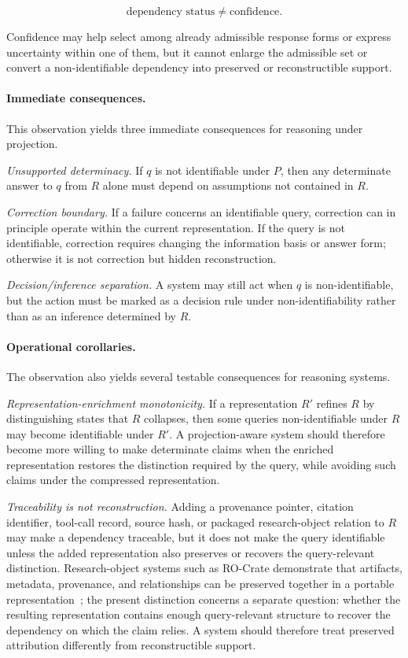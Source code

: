 \documentclass[11pt]{article}
\theoremstyle{definition}
\theoremstyle{remark}
\begin{document}
\[
\boxed{
\text{dependency status}
\neq
\text{confidence}.
}
\]

Confidence may help select among already admissible response forms or express uncertainty within one of them, but it cannot enlarge the admissible set or convert a non-identifiable dependency into preserved or reconstructible support.

\paragraph{Immediate consequences.}
This observation yields three immediate consequences for reasoning under projection.

\emph{Unsupported determinacy.}
If $q$ is not identifiable under $P$, then any determinate answer to $q$ from $R$ alone must depend on assumptions not contained in $R$.

\emph{Correction boundary.}
If a failure concerns an identifiable query, correction can in principle operate within the current representation. If the query is not identifiable, correction requires changing the information basis or answer form; otherwise it is not correction but hidden reconstruction.

\emph{Decision/inference separation.}
A system may still act when $q$ is non-identifiable, but the action must be marked as a decision rule under non-identifiability rather than as an inference determined by $R$.

\paragraph{Operational corollaries.}
The observation also yields several testable consequences for reasoning systems.

\emph{Representation-enrichment monotonicity.}
If a representation $R'$ refines $R$ by distinguishing states that $R$ collapses, then some queries non-identifiable under $R$ may become identifiable under $R'$. A projection-aware system should therefore become more willing to make determinate claims when the enriched representation restores the distinction required by the query, while avoiding such claims under the compressed representation.

\emph{Traceability is not reconstruction.}
Adding a provenance pointer, citation identifier, tool-call record, source hash, or packaged research-object relation to $R$ may make a dependency traceable, but it does not make the query identifiable unless the added representation also preserves or recovers the query-relevant distinction. Research-object systems such as RO-Crate demonstrate that artifacts, metadata, provenance, and relationships can be preserved together in a portable representation~\cite{SoilandReyes2022}; the present distinction concerns a separate question: whether the resulting representation contains enough query-relevant structure to recover the dependency on which the claim relies. A system should therefore treat preserved attribution differently from reconstructible support.
\end{document}
